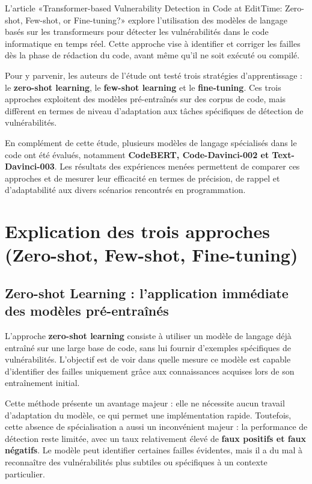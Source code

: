 \begin{center} L’article «Transformer-based Vulnerability
Detection in Code at EditTime: Zero-shot, Few-shot, or Fine-tuning?» explore
l’utilisation des modèles de langage basés sur les transformeurs pour détecter
les vulnérabilités dans le code informatique en temps réel. Cette approche vise
à identifier et corriger les failles dès la phase de rédaction du code, avant
même qu’il ne soit exécuté ou compilé.



Pour y parvenir, les auteurs de l’étude ont
testé trois stratégies d’apprentissage : le \textbf{zero-shot learning}, le \textbf{few-shot
learning} et le \textbf{fine-tuning}. Ces trois approches exploitent des
modèles pré-entraînés sur des corpus de code, mais diffèrent en termes de
niveau d’adaptation aux tâches spécifiques de détection de vulnérabilités.



En complément de cette étude, plusieurs
modèles de langage spécialisés dans le code ont été évalués, notamment \textbf{CodeBERT,
Code-Davinci-002 et Text-Davinci-003}. Les résultats des expériences menées
permettent de comparer ces approches et de mesurer leur efficacité en termes de
précision, de rappel et d’adaptabilité aux divers scénarios rencontrés en
programmation.\end{center}
\chapter{Explication des trois approches (Zero-shot, Few-shot, Fine-tuning)}



\section{Zero-shot Learning : l’application immédiate des modèles pré-entraînés}

L’approche \textbf{zero-shot learning} consiste à utiliser un modèle de langage déjà entraîné
sur une large base de code, sans lui fournir d’exemples spécifiques de vulnérabilités. L’objectif est
de voir dans quelle mesure ce modèle est capable d’identifier des failles
uniquement grâce aux connaissances acquises lors de son entraînement initial.

Cette méthode présente un avantage majeur :
elle ne nécessite aucun travail d’adaptation du modèle, ce qui permet une
implémentation rapide. Toutefois, cette absence de spécialisation a aussi un
inconvénient majeur : la performance de détection reste limitée, avec un taux
relativement élevé de \textbf{faux positifs et faux négatifs}. Le modèle peut
identifier certaines failles évidentes, mais il a du mal à reconnaître des
vulnérabilités plus subtiles ou spécifiques à un contexte particulier.

